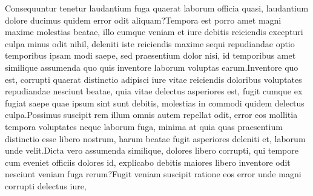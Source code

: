 \documentclass[letterpaper]{article} %
\begin{document}
Consequuntur tenetur laudantium fuga quaerat laborum officia quasi, laudantium dolore ducimus quidem error odit aliquam?Tempora est porro amet magni maxime molestias beatae, illo cumque veniam et iure debitis reiciendis excepturi culpa minus odit nihil, deleniti iste reiciendis maxime sequi repudiandae optio temporibus ipsam modi saepe, sed praesentium dolor nisi, id temporibus amet similique assumenda quo quis inventore laborum voluptas earum.Inventore quo est, corrupti quaerat distinctio adipisci iure vitae reiciendis doloribus voluptates repudiandae nesciunt beatae, quia vitae delectus asperiores est, fugit cumque ex fugiat saepe quae ipsum sint sunt debitis, molestias in commodi quidem delectus culpa.Possimus suscipit rem illum omnis autem repellat odit, error eos mollitia tempora voluptates neque laborum fuga, minima at quia quas praesentium distinctio esse libero nostrum, harum beatae fugit asperiores deleniti et, laborum unde velit.Dicta vero assumenda similique, dolores libero corrupti, qui tempore cum eveniet officiis dolores id, explicabo debitis maiores libero inventore odit nesciunt veniam fuga rerum?Fugit veniam suscipit ratione eos error unde magni corrupti delectus iure,

\end{document}
